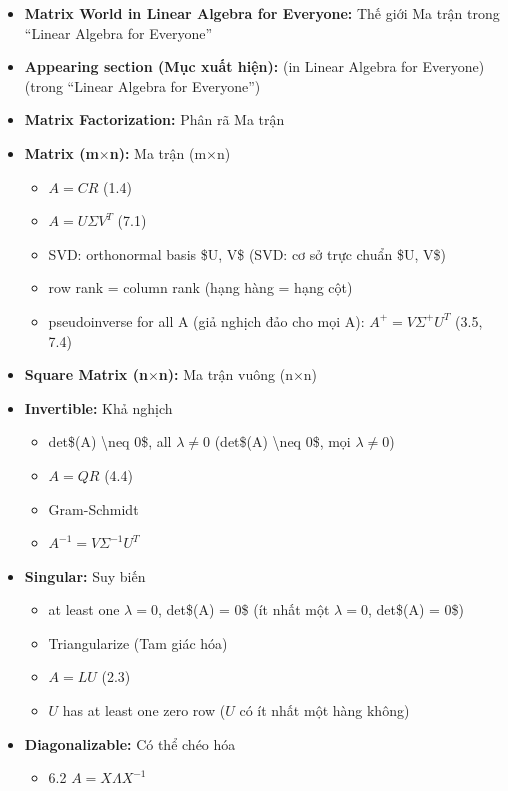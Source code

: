 \begin{itemize}
  \item \textbf{Matrix World in Linear Algebra for Everyone:} Thế giới Ma trận trong ``Linear Algebra for Everyone''
  \item \textbf{Appearing section (Mục xuất hiện):} (in Linear Algebra for Everyone) (trong ``Linear Algebra for Everyone'')
  \item \textbf{Matrix Factorization:} Phân rã Ma trận
  \item \textbf{Matrix (m$\times$n):} Ma trận (m$\times$n)
\begin{itemize}
  \item $A = CR$ (1.4)
  \item $A = U\Sigma V^T$ (7.1)
  \item SVD: orthonormal basis \$U, V\$ (SVD: cơ sở trực chuẩn \$U, V\$)
  \item row rank = column rank (hạng hàng = hạng cột)
  \item pseudoinverse for all A (giả nghịch đảo cho mọi A): $A^+ = V\Sigma^+ U^T$ (3.5, 7.4)
\end{itemize}
  \item \textbf{Square Matrix (n$\times$n):} Ma trận vuông (n$\times$n)
  \item \textbf{Invertible:} Khả nghịch
\begin{itemize}
  \item det\$(A) \textbackslash{}neq 0\$, all $\lambda \neq 0$ (det\$(A) \textbackslash{}neq 0\$, mọi $\lambda \neq 0$)
  \item $A = QR$ (4.4)
  \item Gram-Schmidt
  \item $A^{-1} = V\Sigma^{-1} U^T$
\end{itemize}
  \item \textbf{Singular:} Suy biến
\begin{itemize}
  \item at least one $\lambda = 0$, det\$(A) = 0\$ (ít nhất một $\lambda = 0$, det\$(A) = 0\$)
  \item Triangularize (Tam giác hóa)
  \item $A = LU$ (2.3)
  \item $U$ has at least one zero row ($U$ có ít nhất một hàng không)
\end{itemize}
  \item \textbf{Diagonalizable:} Có thể chéo hóa
\begin{itemize}
  \item 6.2 $A = X\Lambda X^{-1}$

\end{itemize}
\end{itemize}
